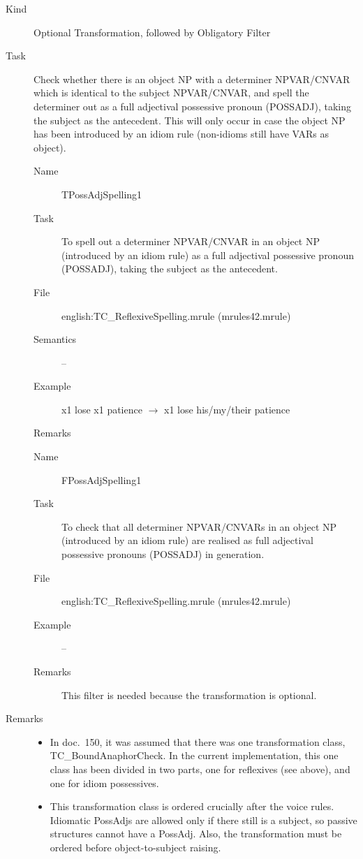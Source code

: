 \begin{description}
\item[Kind] Optional Transformation, followed by Obligatory Filter
\item[Task] Check whether there is an object NP with a determiner NPVAR/CNVAR 
which is identical to the subject NPVAR/CNVAR, and spell the determiner out 
as a full 
adjectival possessive pronoun (POSSADJ), taking the subject as the antecedent.
This will only occur in case the object NP has been introduced by an idiom rule
(non-idioms still have VARs as object).

\vspace{1 cm}
\begin{description}
\item[Name] TPossAdjSpelling1
\item[Task] To spell out a determiner NPVAR/CNVAR in an object NP 
(introduced by an idiom rule) as a full 
adjectival possessive pronoun (POSSADJ), taking the subject as the antecedent.
\item[File] english:TC\_ReflexiveSpelling.mrule (mrules42.mrule)
\item[Semantics] --
\item[Example] x1 lose x1 patience $\rightarrow$ x1 lose his/my/their patience
\item[Remarks]
\end{description}

\vspace{1 cm}
\begin{description}
\item[Name] FPossAdjSpelling1
\item[Task] To check that all determiner NPVAR/CNVARs in an object NP 
(introduced by an idiom rule) are realised as full 
adjectival possessive pronouns (POSSADJ) in generation.
\item[File] english:TC\_ReflexiveSpelling.mrule (mrules42.mrule)
\item[Example] --
\item[Remarks] This filter is needed because the transformation is optional.
\end{description}

\vspace{1 cm}
\item[Remarks] \mbox{}
  \begin{itemize}
  \item In doc.\ 150, it was assumed that there was one transformation class, 
TC\_BoundAnaphorCheck. In the current implementation, this one class has been 
divided in two parts, one for reflexives (see above), and one for idiom 
possessives.
  \item This transformation class is ordered crucially after the voice rules. 
Idiomatic PossAdjs are allowed only if there still is a subject, so passive 
structures 
cannot have a PossAdj. Also, the transformation must be ordered before 
object-to-subject raising.
  \end{itemize}
\end{description}

